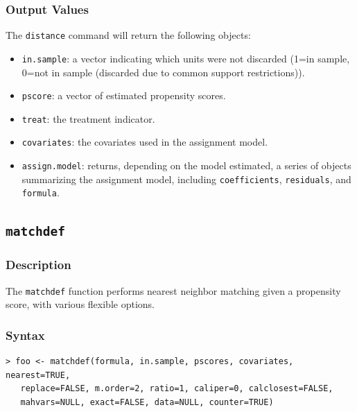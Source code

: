\documentclass[oneside,letterpaper,titlepage]{article}
\begin{document}
\begin{appendix}
\subsubsection{Output Values}
The \texttt{distance} command will return the following objects:
\begin{itemize}
\item \texttt{in.sample}: a vector indicating which units were not discarded
  (1=in sample, 0=not in sample (discarded due to common support
  restrictions)).
\item \texttt{pscore}: a vector of estimated propensity scores. 
\item \texttt{treat}: the treatment indicator.
\item \texttt{covariates}: the covariates used in the
  assignment model.
\item \texttt{assign.model}: returns, depending on the model estimated, a 
  series of objects summarizing the assignment model, including
  \texttt{coefficients}, \texttt{residuals},
  and \texttt{formula}. 
\end{itemize}

\subsection{\texttt{matchdef}}
\subsubsection{Description}
The \texttt{matchdef} function performs nearest neighbor matching
given a propensity score, with various flexible options. 

\subsubsection{Syntax}
\begin{verbatim}
> foo <- matchdef(formula, in.sample, pscores, covariates, nearest=TRUE,
   replace=FALSE, m.order=2, ratio=1, caliper=0, calclosest=FALSE,
   mahvars=NULL, exact=FALSE, data=NULL, counter=TRUE)
\end{verbatim}


\end{appendix}
\end{document}
